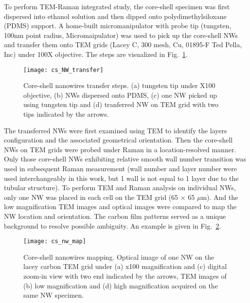 To perform TEM-Raman integrated study, the core-shell specimen was first dispersed into ethanol solution and then dipped onto polydimethylsiloxane (PDMS) support. A home-built micromanipulator with probe tip (tungsten, 100nm point radius, Micromaipulator) was used to pick up the core-shell NWs and transfer them onto TEM grids (Lacey C, 300 mesh, Cu, 01895-F Ted Pella, Inc) under 100X objective. The steps are visualized in Fig.~\ref{fig:ch5ws2trans}. 
\begin{figure}[htb]
\centering
\texttt{[image: cs\_NW\_transfer]}
\caption[Core-shell nanowires transfer steps]{Core-shell nanowires transfer steps. (a) tungsten tip under X100 objective, (b) NWs dispersed onto PDMS, (c) one NW picked up using tungsten tip and (d) tranferred NW on TEM grid with two tips indicated by the arrows.}
\label{fig:ch5ws2trans}
\end{figure}
The transferred NWs were first examined using TEM to identify the  layers configuration and the associated geometrical orientation. Then the core-shell NWs on TEM grids were probed under Raman in a location-resolved manner. Only those core-shell NWs exhibiting relative smooth  wall number transition was used in subsequent Raman measurement (wall number and layer number were used interchangeably in this work, but 1 wall is not equal to 1 layer due to the tubular structure). To perform TEM and Raman analysis on individual NWs, only one NW was placed in each cell on the TEM grid (65 $\times$ 65 $\mu$m). And the low magnification TEM images and optical images were compared to map the NW location and orientation. The carbon film patterns served as a unique background to resolve possible ambiguity. An example is given in Fig.~\ref{fig:ch5ws2map}. 
\begin{figure}[htb]
\centering
\texttt{[image: cs\_nw\_map]}
\caption[Core-shell nanowires mapping]{Core-shell nanowires mapping. Optical image of one NW on the lacey  carbon TEM grid under (a) x100 magnification and (c) digital zoom-in view with two end indicated by the arrows, TEM images of (b) low magnification and (d) high magnification acquired on the same NW specimen.}
\label{fig:ch5ws2map}
\end{figure}

